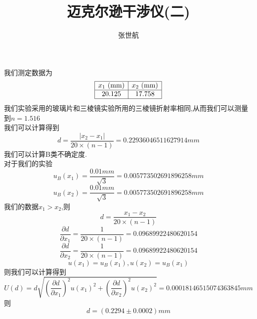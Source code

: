 \documentclass[10pt, a4paper]{article}
\author{张世航}
\title{迈克尔逊干涉仪(二)}
\begin{document}
	\maketitle
	我们测定数据为
	\[
	\begin{array}{|c|c|}
		\hline
		x_1 \text{ (mm)} & x_2 \text{ (mm)} \\
		\hline
		20.125 & 17.758 \\
		\hline
	\end{array}
	\]
	我们实验采用的玻璃片和三棱镜实验所用的三棱镜折射率相同,从而我们可以测量到$n = 1.516$\\
	我们可以计算得到
	\[d = \frac{|x_2-x_1|}{20\times(n-1)} = 0.22936046511627914mm\]
	我们可以计算B类不确定度.\\
	对于我们的实验
	\[u_B(x_1) = \frac{0.01mm}{\sqrt{3}} = 0.005773502691896258mm\]
	\[u_B(x_2) = \frac{0.01mm}{\sqrt{3}} = 0.005773502691896258mm\]
	我们的数据$x_1>x_2$,则
	\[d = \frac{x_1-x_2}{20\times(n-1)}\]
	\[\frac{\partial d}{\partial x_1} = \frac{1}{20\times(n-1)} = 0.09689922480620154\]
	\[\frac{\partial d}{\partial x_2} = \frac{1}{20\times(n-1)} = 0.09689922480620154\]
    \[u(x_1)=u_B(x_1),u(x_2)=u_B(x_1)\]
    则我们可以计算得到
    \[U(d) = d\sqrt{(\frac{\partial d}{\partial x_1})^2u(x_1)^2+(\frac{\partial d}{\partial x_2})^2u(x_2)^2} = 0.00018146515074363845mm\]
    则\[d = (0.2294\pm0.0002)mm\]
\end{document}
